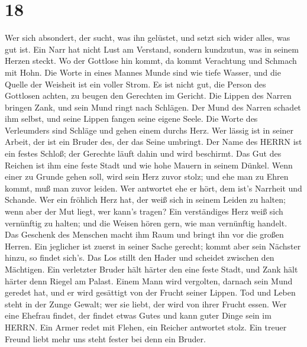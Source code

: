 \hypertarget{section-17}{%
\section{18}\label{section-17}}

 Wer sich absondert, der sucht, was ihn gelüstet, und setzt
sich wider alles, was gut ist.  Ein Narr hat nicht Lust am
Verstand, sondern kundzutun, was in seinem Herzen steckt. 
Wo der Gottlose hin kommt, da kommt Verachtung und Schmach mit Hohn.
 Die Worte in eines Mannes Munde sind wie tiefe Wasser, und
die Quelle der Weisheit ist ein voller Strom.  Es ist nicht
gut, die Person des Gottlosen achten, zu beugen den Gerechten im
Gericht.  Die Lippen des Narren bringen Zank, und sein Mund
ringt nach Schlägen.  Der Mund des Narren schadet ihm
selbst, und seine Lippen fangen seine eigene Seele.  Die
Worte des Verleumders sind Schläge und gehen einem durchs Herz.
 Wer lässig ist in seiner Arbeit, der ist ein Bruder des,
der das Seine umbringt.  Der Name des HERRN ist ein festes
Schloß; der Gerechte läuft dahin und wird beschirmt.  Das
Gut des Reichen ist ihm eine feste Stadt und wie hohe Mauern in seinem
Dünkel.  Wenn einer zu Grunde gehen soll, wird sein Herz
zuvor stolz; und ehe man zu Ehren kommt, muß man zuvor leiden.
 Wer antwortet ehe er hört, dem ist's Narrheit und Schande.
 Wer ein fröhlich Herz hat, der weiß sich in seinem Leiden
zu halten; wenn aber der Mut liegt, wer kann's tragen?  Ein
verständiges Herz weiß sich vernünftig zu halten; und die Weisen hören
gern, wie man vernünftig handelt.  Das Geschenk des
Menschen macht ihm Raum und bringt ihn vor die großen Herren.
 Ein jeglicher ist zuerst in seiner Sache gerecht; kommt
aber sein Nächster hinzu, so findet sich's.  Das Los stillt
den Hader und scheidet zwischen den Mächtigen.  Ein
verletzter Bruder hält härter den eine feste Stadt, und Zank hält härter
denn Riegel am Palast.  Einem Mann wird vergolten, darnach
sein Mund geredet hat, und er wird gesättigt von der Frucht seiner
Lippen.  Tod und Leben steht in der Zunge Gewalt; wer sie
liebt, der wird von ihrer Frucht essen.  Wer eine Ehefrau
findet, der findet etwas Gutes und kann guter Dinge sein im HERRN.
 Ein Armer redet mit Flehen, ein Reicher antwortet stolz.
 Ein treuer Freund liebt mehr uns steht fester bei denn ein
Bruder.

